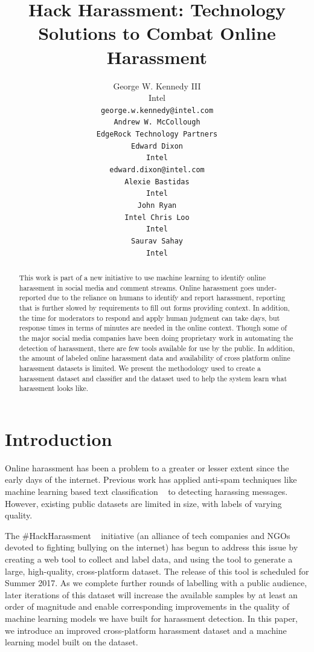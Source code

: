 \documentclass[11pt,a4paper]{article}
\title{Hack Harassment: Technology Solutions to Combat Online Harassment}
\author{George W. Kennedy III \\ Intel \\ \tt {george.w.kennedy@intel.com}\\ \And Andrew W. McCollough \\ EdgeRock Technology Partners\\  \AND Edward Dixon \\ Intel \\ \tt {edward.dixon@intel.com} \\ \And Alexie Bastidas \\ Intel \\ \And John Ryan \\ Intel \And Chris Loo \\ Intel \\ \And Saurav Sahay \\ Intel \\}
\date{}
\begin{document}
\maketitle
\begin{abstract}
  This work is part of a new initiative to use machine
  learning to identify online harassment in social media
  and comment streams. Online harassment goes
  under-reported due to the reliance on humans to
  identify and report harassment, reporting that is further
  slowed by requirements to fill out forms
  providing context. In addition, the time for moderators
  to respond and apply human judgment can
  take days, but response times in terms of minutes
  are needed in the online context. Though some of
  the major social media companies have been doing
  proprietary work in automating the detection of
  harassment, there are few tools available for use by
  the public. In addition, the amount of labeled online
  harassment data and availability of cross platform
  online harassment datasets is limited. We present
  the methodology used to create a harassment dataset
  and classifier and the dataset used to help the
  system learn what harassment looks like.

\end{abstract}

\section{Introduction}

Online harassment has been a problem to a greater
or lesser extent since the early days of the internet.
Previous work has applied anti-spam techniques
like machine learning based text classification 
~\cite{Reynolds:2011} to
detecting harassing messages. However, existing
public datasets are limited in size, with labels of
varying quality.

The \#HackHarassment ~\cite{HH:2017} initiative 
(an alliance of tech companies and
NGOs devoted to fighting bullying on the internet)
has begun to address this issue by creating a web
tool to collect and label data, and using the tool to
generate a large, high-quality, cross-platform dataset.
The release of this tool is scheduled for Summer
2017. As we complete further rounds of labelling
with a public audience, later iterations of this dataset
will increase the available samples by at least
an order of magnitude and enable corresponding
improvements in the quality of machine learning
models we have built for harassment detection. In
this paper, we introduce an improved cross-platform
harassment dataset and a machine learning
model built on the dataset.
\end{document}
